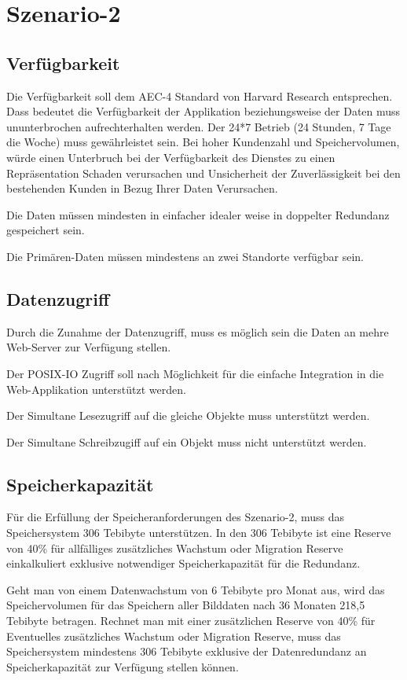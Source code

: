 \section{Szenario-2}

\subsection{Verfügbarkeit}
Die Verfügbarkeit soll dem AEC-4 Standard von Harvard Research entsprechen. Dass bedeutet die Verfügbarkeit der Applikation beziehungsweise der Daten muss ununterbrochen aufrechterhalten werden.  Der 24*7 Betrieb (24 Stunden, 7 Tage die Woche) muss gewährleistet sein. Bei hoher Kundenzahl und Speichervolumen, würde einen Unterbruch bei der Verfügbarkeit des Dienstes zu einen Repräsentation Schaden verursachen und Unsicherheit der Zuverlässigkeit bei den bestehenden Kunden in Bezug Ihrer Daten Verursachen.

Die Daten müssen mindesten in einfacher idealer weise in doppelter Redundanz gespeichert sein. 

Die \gls{Primären-Daten} müssen mindestens an zwei Standorte verfügbar sein.

\subsection{Datenzugriff}
Durch die Zunahme der Datenzugriff, muss es möglich sein die Daten an mehre Web-Server zur Verfügung stellen.

Der \gls{POSIX-IO} Zugriff soll nach Möglichkeit für die einfache Integration in die Web-Applikation unterstützt werden.

Der Simultane Lesezugriff auf die gleiche Objekte muss unterstützt werden.

Der Simultane Schreibzugiff auf ein Objekt muss nicht unterstützt werden.

\subsection{Speicherkapazität}
Für die Erfüllung der Speicheranforderungen des Szenario-2, muss das Speichersystem 306 Tebibyte unterstützen. In den 306 Tebibyte ist eine Reserve von 40\% für allfälliges zusätzliches Wachstum oder Migration Reserve einkalkuliert exklusive notwendiger Speicherkapazität für die Redundanz.

Geht man von einem Datenwachstum von 6 Tebibyte pro Monat aus, wird das Speichervolumen für das Speichern aller Bilddaten nach 36 Monaten 218,5 Tebibyte betragen. Rechnet man mit einer zusätzlichen Reserve von 40\% für Eventuelles zusätzliches Wachstum oder Migration Reserve, muss das Speichersystem mindestens 306 Tebibyte exklusive der Datenredundanz an Speicherkapazität zur Verfügung stellen können.

